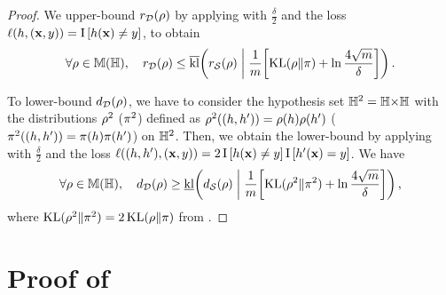 \begin{noaddcontents}
\begin{proof}
We upper-bound $r_{\D}(\Q)$ by applying  with $\frac{\delta}{2}$ and the loss $\loss(\h, (\x,\y)) = \indic\LB \h(\x)\ne \y\RB$, to obtain 
\begin{align*}
    \forall\Q\in\M(\H),\quad r_{\D}(\Q) \le \klmax\!\LP r_{\dS}(\Q) \;\middle|\; \frac{1}{\m}\!\LB\KL(\Q\|\P)+\ln\frac{4\sqrt{\m}}{\delta}\RB\RP.
\end{align*}

To lower-bound $d_{\D}(\Q)$, we have to consider the hypothesis set $\H^2 = \H{\times}\H$ with the distributions $\Q^2$ (\resp $\P^2$) defined as $\Q^2((\h, \h'))=\Q(\h)\Q(\h')$ (\resp $\P^2((\h, \h'))=\P(\h)\P(\h')$) on $\H^2$.
Then, we obtain the lower-bound by applying  with $\frac{\delta}{2}$ and the loss $\loss((\h, \h'), (\x,\y)) = 2\indic\LB \h(\x)\ne \y\RB\indic\LB \h'(\x)= \y\RB$.
We have
\begin{align*}
    \forall\Q\in\M(\H),\quad d_{\D}(\Q) \ge \klmin\!\LP d_{\dS}(\Q) \;\middle|\; \frac{1}{\m}\!\LB\KL(\Q^2\|\P^2)+\ln\frac{4\sqrt{\m}}{\delta}\RB\RP,
\end{align*}
where $\KL(\Q^2\|\P^2)=2\KL(\Q\|\P)$ from .
\end{proof}

\section{Proof of~}
\label{ap:mv:sec:proof-cbound-lacasse}


\end{noaddcontents}
